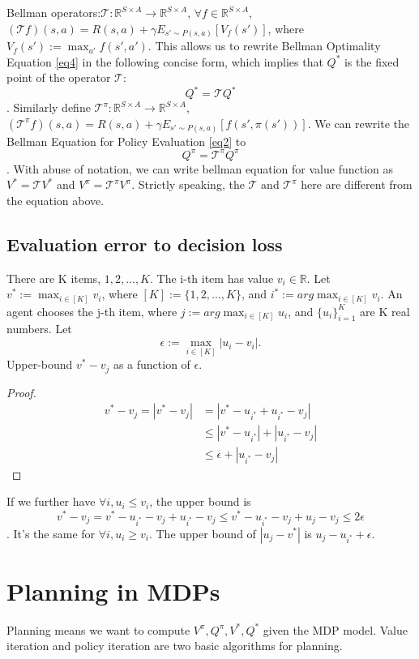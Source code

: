 \documentclass{report}
\begin{document}
Bellman operators:$\mathcal{T}: \mathbb{R}^{S\times A}\rightarrow \mathbb{R}^{S\times A}$, $\forall f \in \mathbb{R}^{S\times A}$, $(\mathcal{T}f)(s,a)=R(s,a)+\gamma E_{s'\sim P(s,a)}[V_f(s')]$, where $V_f(s'):=\max_{a'}f(s',a')$. This allows us to rewrite Bellman Optimality Equation \ref{eq4} in the following concise form, which implies that $Q^*$ is the fixed point of the operator $\mathcal{T}$:\[Q^*=\mathcal{T}Q^*\]. Similarly define $\mathcal{T}^{\pi}: \mathbb{R}^{S\times A}\rightarrow \mathbb{R}^{S\times A}$, $(\mathcal{T}^{\pi}f)(s,a)=R(s,a)+\gamma E_{s'\sim P(s,a)}[f(s',\pi(s'))]$. We can rewrite the Bellman Equation for Policy Evaluation \ref{eq2} to \[Q^{\pi}=\mathcal{T}^{\pi}Q^{\pi}\]. With abuse of notation, we can write bellman equation for value function as $V^{*}=\mathcal{T}V^*$ and $V^{\pi}=\mathcal{T}^{\pi}V^{\pi}$. Strictly speaking, the $\mathcal{T}$ and $\mathcal{T}^{\pi}$ here are different from the equation above.
\subsection{Evaluation error to decision loss}
There are K items, $1, 2,\hdots, K$. The i-th item has value $v_i \in \mathbb{R}$. Let $v^*:=\max_{i \in [K]}v_i$, where $[K]:=\{1,2,\hdots,K\}$, and $i^*:=arg\max_{i \in [K]}v_i$. An agent chooses the j-th item, where $j:=arg\max_{i \in [K]}u_i$, and $\{u_i\}_{i=1}^{K}$ are K real numbers. Let \[
\epsilon:=\max_{i \in [K]}|u_i-v_i|.
\]Upper-bound $v^*-v_j$ as a function of $\epsilon$.
\begin{proof}
    \begin{equation*}
        \begin{split}
            v^*-v_j = |v^*-v_j|  &= |v^*-u_{i^*}+u_{i^*}-v_j|\\
            &\leq |v^*-u_{i^*}| + |u_{i^*}-v_j|\\
            &\leq \epsilon + |u_{i^*}-v_j|
        \end{split}
    \end{equation*}
\end{proof}
If we further have $\forall i, u_i \leq v_i$, the upper bound is \[
v^*-v_j = v^*-u_{i^*}-v_j+u_{i^*}-v_j \leq v^*-u_{i^*}-v_j+u_j-v_j \leq 2\epsilon
\]. It's the same for $\forall i, u_i \geq v_i$. The upper bound of $|u_j-v^*|$ is $u_j-u_{i^*}+\epsilon$.

\section{Planning in MDPs}
Planning means we want to compute $V^{\pi}, Q^{\pi}, V^{*}, Q^{*}$ given the MDP model. Value iteration and policy iteration are two basic algorithms for planning.
\end{document}
